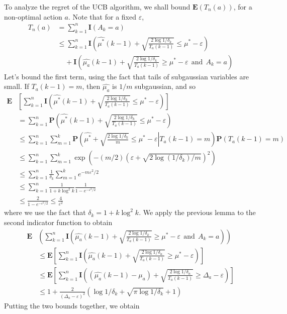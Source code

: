 To analyze the regret of the UCB algorithm, we shall bound $\mathbf{E}(T_n(a))$, for a non-optimal action $a$. Note that for a fixed $\varepsilon$,
%
\begin{align*}
    T_n(a) &= \sum_{k = 1}^n \mathbf{I}(A_k = a)\\
    &\leq \sum_{k = 1}^n \mathbf{I} \left(\widehat{\mu^*}(k-1) + \sqrt{\frac{2 \log 1/\delta_k}{T_a(k-1)}} \leq \mu^* - \varepsilon \right)\\
    &\ \ \ \ \ + \mathbf{I} \left(\widehat{\mu_a}(k-1) + \sqrt{\frac{2 \log 1/\delta_k}{T_a(k-1)}} \geq \mu^* - \varepsilon\ \ \text{and}\ \ A_k = a \right)
\end{align*}
%
Let's bound the first term, using the fact that tails of subgaussian variables are small. If $T_a(k-1) = m$, then $\widehat{\mu_a}$ is $1/m$ subgaussian, and so
%
\begin{align*}
    \mathbf{E}& \left[ \sum_{k = 1}^n \mathbf{I} \left(\widehat{\mu^*}(k-1) + \sqrt{\frac{2 \log 1/\delta_k}{T_a(k-1)}} \leq \mu^* - \varepsilon \right) \right]\\
    &= \sum_{k = 1}^n \mathbf{P}\left(\widehat{\mu^*}(k-1) + \sqrt{\frac{2 \log 1/\delta_k}{T_a(k-1)}} \leq \mu^* - \varepsilon \right)\\
    &\leq \sum_{k = 1}^n \sum_{m = 1}^k \mathbf{P}\left( \left. \widehat{\mu^*} + \sqrt{\frac{2 \log 1/\delta_k}{m}} \leq \mu^* - \varepsilon \right| T_a(k-1) = m \right) \mathbf{P}(T_a(k-1) = m)\\
    &\leq \sum_{k = 1}^n \sum_{m = 1}^k \exp\left(-(m/2) \left(\varepsilon + \sqrt{2 \log(1/\delta_k)/m}\right)^2 \right)\\
    &\leq \sum_{k = 1}^n \frac{1}{\delta_k} \sum_{m = 1}^k e^{-m\varepsilon^2/2}\\
    &\leq \sum_{k = 1}^n \frac{1}{1 + k \log^2 k} \frac{1}{1 - e^{- \varepsilon^2/2}}\\
    &\leq \frac{2}{1 - e^{- \varepsilon^2/2}} \leq \frac{4}{\varepsilon^2}
\end{align*}
%
where we use the fact that $\delta_k = 1 + k \log^2 k$. We apply the previous lemma to the second indicator function to obtain
%
\begin{align*}
    \mathbf{E}& \left( \sum_{k = 1}^n \mathbf{I} \left(\widehat{\mu_a}(k-1) + \sqrt{\frac{2 \log 1/\delta_k}{T_a(k-1)}} \geq \mu^* - \varepsilon\ \ \text{and}\ \ A_k = a \right) \right)\\
    &\leq \mathbf{E} \left[ \sum_{k = 1}^n \mathbf{I}(\widehat{\mu_a}(k-1) + \sqrt{\frac{2 \log 1/\delta_n}{T_a(k-1)}} \geq \mu^* - \varepsilon) \right]\\
    &\leq \mathbf{E} \left[ \sum_{k = 1}^n \mathbf{I}((\widehat{\mu_a}(k-1) - \mu_a) + \sqrt{\frac{2 \log 1/\delta_n}{T_a(k-1)}} \geq \Delta_a - \varepsilon) \right]\\
    &\leq 1 + \frac{2}{(\Delta_a - \varepsilon)^2} \left( \log 1/\delta_k + \sqrt{\pi \log 1/\delta_k} + 1 \right)
\end{align*}
%
Putting the two bounds together, we obtain

